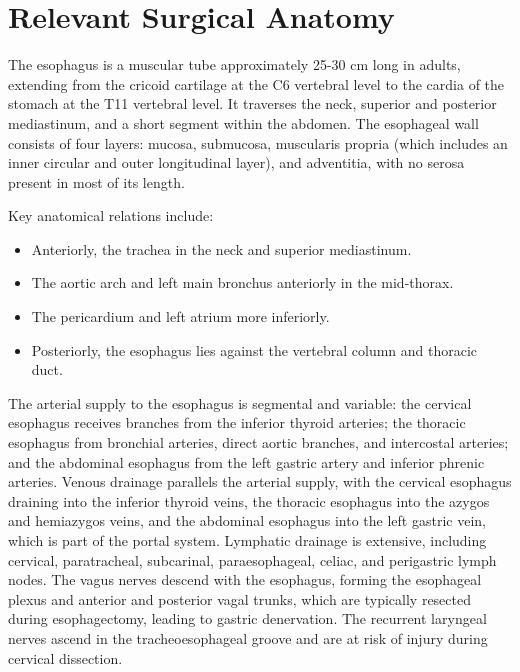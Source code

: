 \section*{Relevant Surgical Anatomy}
The esophagus is a muscular tube approximately 25-30 cm long in adults, extending from the cricoid cartilage at the C6 vertebral level to the cardia of the stomach at the T11 vertebral level. It traverses the neck, superior and posterior mediastinum, and a short segment within the abdomen. The esophageal wall consists of four layers: mucosa, submucosa, muscularis propria (which includes an inner circular and outer longitudinal layer), and adventitia, with no serosa present in most of its length. 

Key anatomical relations include:

\begin{itemize}
  \item Anteriorly, the trachea in the neck and superior mediastinum.
  \item The aortic arch and left main bronchus anteriorly in the mid-thorax.
  \item The pericardium and left atrium more inferiorly.
  \item Posteriorly, the esophagus lies against the vertebral column and thoracic duct.
\end{itemize}

The arterial supply to the esophagus is segmental and variable: the cervical esophagus receives branches from the inferior thyroid arteries; the thoracic esophagus from bronchial arteries, direct aortic branches, and intercostal arteries; and the abdominal esophagus from the left gastric artery and inferior phrenic arteries. Venous drainage parallels the arterial supply, with the cervical esophagus draining into the inferior thyroid veins, the thoracic esophagus into the azygos and hemiazygos veins, and the abdominal esophagus into the left gastric vein, which is part of the portal system. Lymphatic drainage is extensive, including cervical, paratracheal, subcarinal, paraesophageal, celiac, and perigastric lymph nodes. The vagus nerves descend with the esophagus, forming the esophageal plexus and anterior and posterior vagal trunks, which are typically resected during esophagectomy, leading to gastric denervation. The recurrent laryngeal nerves ascend in the tracheoesophageal groove and are at risk of injury during cervical dissection.

